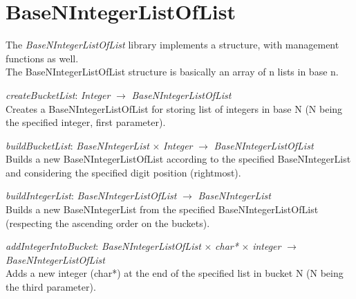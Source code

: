 \documentclass[book, backcover, english, nodocumentinfo]{upmethodology-document}
\begin{document}
	\section{BaseNIntegerListOfList}
		The \textit{BaseNIntegerListOfList} library implements a structure, with management functions as well.\\
		The BaseNIntegerListOfList structure is basically an array of n lists in base n.\\

		\begin{minipage}{\linewidth}
			\textit{createBucketList}: \textit{Integer} $\rightarrow$ \textit{BaseNIntegerListOfList}\\
			Creates a BaseNIntegerListOfList for storing list of integers in base N (N being the specified integer, first parameter).
			\label{algo:BNIL-CreateBucketList}
			
		\end{minipage}
		\nxtalgo{}

		\begin{minipage}{\linewidth}
			\textit{buildBucketList}: \textit{BaseNIntegerList} $\times$ \textit{Integer} $\rightarrow$ \textit{BaseNIntegerListOfList}\\
			Builds a new BaseNIntegerListOfList according to the specified BaseNIntegerList and considering the specified digit position (rightmost).
			\label{algo:BNIL-BuildBucketList}
			
		\end{minipage}
		\nxtalgo{}

		\begin{minipage}{\linewidth}
			\textit{buildIntegerList}: \textit{BaseNIntegerListOfList} $\rightarrow$ \textit{BaseNIntegerList}\\
			Builds a new BaseNIntegerList from the specified BaseNIntegerListOfList (respecting the ascending order on the buckets).
			\label{algo:BNIL-BuildIntegerList}
			
		\end{minipage}
		\nxtalgo{}

		\begin{minipage}{\linewidth}
			\textit{addIntegerIntoBucket}: \textit{BaseNIntegerListOfList} $\times$  \textit{char*} $\times$  \textit{integer} $\rightarrow$ \textit{BaseNIntegerListOfList}\\
			Adds a new integer (char*) at the end of the specified list in bucket N (N being the third parameter).
			\label{algo:BNIL-AddIntegerIntoBucket}
			
		\end{minipage}
		\nxtalgo{}
\end{document}
